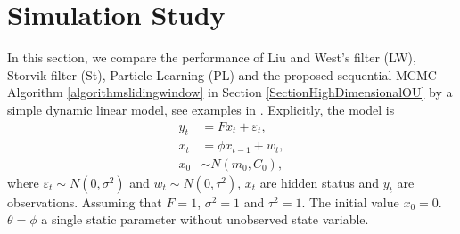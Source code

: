 \section{Simulation Study}\label{sectionFilterreviewSimulation}



In this section, we compare the performance of Liu and West's filter (LW), Storvik filter (St), Particle Learning (PL) and the proposed sequential MCMC Algorithm \ref{algorithmslidingwindow} in Section \ref{SectionHighDimensionalOU} by a simple dynamic linear model, see examples in \citep{liu2001combined}. Explicitly, the model is 
\begin{align*}
y_t&=F x_t+\varepsilon_t,\\
x_t&=\phi x_{t-1}+w_t,\\
x_0&\sim N(m_0,C_0),
\end{align*}
where $\varepsilon_t\sim N\left(0,\sigma^2\right)$ and $w_t\sim N\left(0,\tau^2\right)$, $x_t$ are hidden status and $y_t$ are observations. Assuming that $F=1$, $\sigma^2=1$ and $\tau^2=1$. The initial value $x_0=0$. $\theta = \phi$ a single static parameter without unobserved state variable. 

